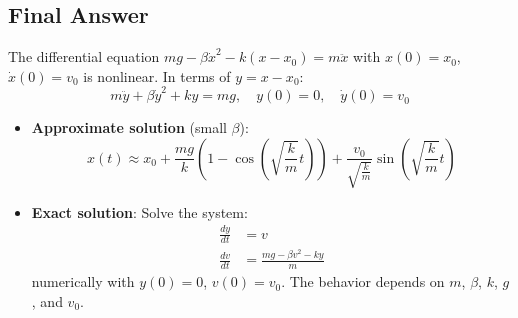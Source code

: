 \documentclass[a4paper,12pt]{article}
\begin{document}
\subsection*{Final Answer}
The differential equation \(mg - \beta \dot{x}^2 - k(x - x_0) = m \ddot{x}\) with \(x(0) = x_0\), \(\dot{x}(0) = v_0\) is nonlinear. In terms of \(y = x - x_0\):
\begin{equation}
m \ddot{y} + \beta \dot{y}^2 + k y = mg, \quad y(0) = 0, \quad \dot{y}(0) = v_0
\end{equation}
\begin{itemize}
    \item \textbf{Approximate solution} (small \(\beta\)):
    \begin{equation}
    x(t) \approx x_0 + \frac{mg}{k} \left(1 - \cos\left(\sqrt{\frac{k}{m}} t\right)\right) + \frac{v_0}{\sqrt{\frac{k}{m}}} \sin\left(\sqrt{\frac{k}{m}} t\right)
    \end{equation}
    \item \textbf{Exact solution}: Solve the system:
    \begin{align}
    \frac{dy}{dt} &= v \\
    \frac{dv}{dt} &= \frac{mg - \beta v^2 - k y}{m}
    \end{align}
    numerically with \(y(0) = 0\), \(v(0) = v_0\). The behavior depends on \(m\), \(\beta\), \(k\), \(g\), and \(v_0\).
\end{itemize}

\end{document}
